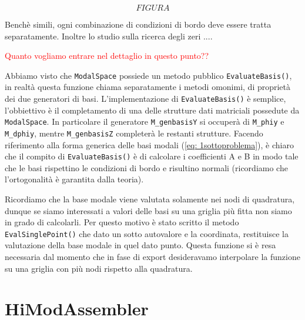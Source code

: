 \begin{equation}
FIGURA
\end{equation}

Bench\`e simili, ogni combinazione di condizioni di bordo deve essere tratta separatamente. Inoltre lo studio sulla ricerca degli zeri ....

\textcolor{red}{Quanto vogliamo entrare nel dettaglio in questo punto??}

Abbiamo visto che \texttt{ModalSpace} possiede un metodo pubblico \texttt{EvaluateBasis()}, in realt\`a questa funzione chiama separatamente i metodi omonimi, di propriet\`a dei due generatori di basi. L'implementazione di \texttt{EvaluateBasis()} \`e semplice, l'obbiettivo \`e il completamento di una delle strutture dati matriciali possedute da \texttt{ModalSpace}. In particolare il generatore \texttt{M\_genbasisY} si occuper\`a di \texttt{M\_phiy} e \texttt{M\_dphiy}, mentre \texttt{M\_genbasisZ} completer\`a le restanti strutture.
Facendo riferimento alla forma generica delle basi modali (\ref{eq: 1sottoproblema}), \`e chiaro che il compito di \texttt{EvaluateBasis()} \`e di calcolare i coefficienti A e B in modo tale che le basi rispettino le condizioni di bordo e risultino normali (ricordiamo che l'ortogonalit\`a \`e garantita dalla teoria).

Ricordiamo che la base modale viene valutata solamente nei nodi di quadratura, dunque se siamo interessati a valori delle basi su una griglia pi\`u fitta non siamo in grado di calcolarli. Per questo motivo \`e stato scritto il metodo \texttt{EvalSinglePoint()} che dato un sotto autovalore e la coordinata, restituisce la valutazione della base modale in quel dato punto. Questa funzione si \`e resa necessaria dal momento che in fase di export desideravamo interpolare la funzione su una griglia con pi\`u nodi rispetto alla quadratura.

\section{HiModAssembler}
 
